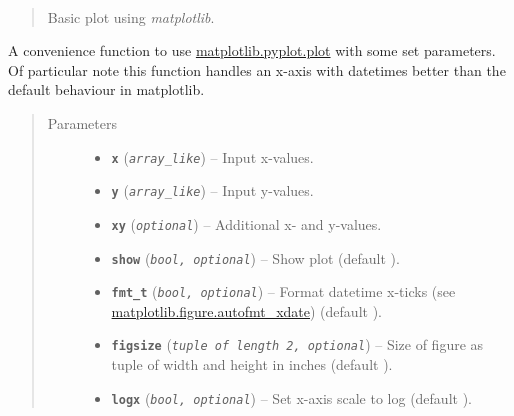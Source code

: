 \documentclass[letterpaper,10pt,english]{sphinxhowto}
\begin{document}

\begin{fulllineitems}
\label{swtools_doc:swtools.plot_basic}~\label{swtools_doc:plot-basic}\begin{quote}

Basic plot using \emph{matplotlib}.
\end{quote}

A convenience function to use \href{http://matplotlib.org/api/pyplot\_api.html\#matplotlib.pyplot.plot}{matplotlib.pyplot.plot}
with some set parameters. Of particular note this function handles an
x-axis with datetimes better than the default behaviour in matplotlib.
\begin{quote}\begin{description}
\item[{Parameters}] \leavevmode\begin{itemize}
\item {} 
\textbf{\texttt{x}} (\emph{\texttt{array\_like}}) -- Input x-values.

\item {} 
\textbf{\texttt{y}} (\emph{\texttt{array\_like}}) -- Input y-values.

\item {} 
\textbf{\texttt{xy}} (\emph{\texttt{optional}}) -- Additional x- and y-values.

\item {} 
\textbf{\texttt{show}} (\emph{\texttt{bool, optional}}) -- Show plot (default ).

\item {} 
\textbf{\texttt{fmt\_t}} (\emph{\texttt{bool, optional}}) -- Format datetime x-ticks (see \href{http://matplotlib.org/api/figure\_api.html?highlight=autofmt\_xdate}{matplotlib.figure.autofmt\_xdate})
(default ).

\item {} 
\textbf{\texttt{figsize}} (\emph{\texttt{tuple of length 2, optional}}) -- Size of figure as tuple of width and height in inches
(default ).

\item {} 
\textbf{\texttt{logx}} (\emph{\texttt{bool, optional}}) -- Set x-axis scale to log (default ).


\end{itemize}
\end{description}
\end{quote}
\end{fulllineitems}
\end{document}
